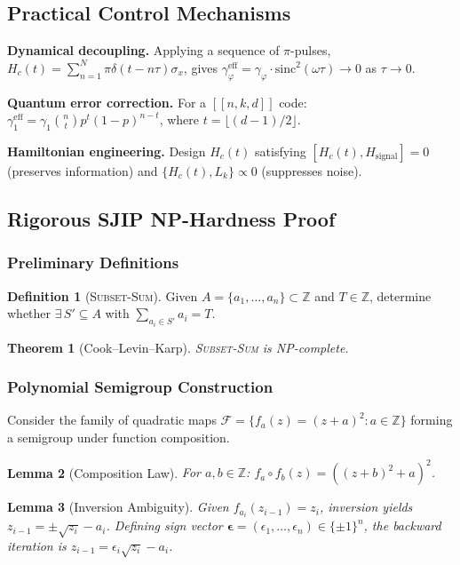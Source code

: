 \documentclass[12pt,a4paper]{article}
\theoremstyle{definition}
\newtheorem{definition}{Definition}[section]
\theoremstyle{plain}
\newtheorem{theorem}{Theorem}[section]
\newtheorem{lemma}[theorem]{Lemma}
\newcommand{\Z}{\mathbb{Z}}
\begin{document}
\subsection{Practical Control Mechanisms}

\textbf{Dynamical decoupling.} Applying a sequence of $\pi$-pulses,
$H_c(t)=\sum_{n=1}^N\pi\delta(t-n\tau)\sigma_x$, gives
$\gamma_\varphi^{\mathrm{eff}}=\gamma_\varphi\cdot\mathrm{sinc}^2(\omega\tau)\to0$ as $\tau\to0$.

\textbf{Quantum error correction.} For a $[[n,k,d]]$ code:
$\gamma_1^{\mathrm{eff}}=\gamma_1\binom{n}{t}p^t(1-p)^{n-t}$, where $t=\lfloor(d-1)/2\rfloor$.

\textbf{Hamiltonian engineering.} Design $H_c(t)$ satisfying
$[H_c(t),H_{\mathrm{signal}}]=0$ (preserves information) and $\{H_c(t),L_k\}\propto0$
(suppresses noise).

\subsection{Rigorous SJIP NP-Hardness Proof}
\label{sec:sjip_proof}

\subsubsection{Preliminary Definitions}

\begin{definition}[\textsc{Subset-Sum}]
Given $A=\{a_1,\dots,a_n\}\subset\Z$ and $T\in\Z$, determine whether $\exists\,S'\subseteq A$
with $\sum_{a_i\in S'}a_i=T$.
\end{definition}

\begin{theorem}[Cook--Levin--Karp]
\textsc{Subset-Sum} is NP-complete.
\end{theorem}

\subsubsection{Polynomial Semigroup Construction}

Consider the family of quadratic maps $\mathcal{F}=\{f_a(z)=(z+a)^2:a\in\Z\}$ forming
a semigroup under function composition.

\begin{lemma}[Composition Law]
For $a,b\in\Z$: $f_a\circ f_b(z)=((z+b)^2+a)^2$.
\end{lemma}

\begin{lemma}[Inversion Ambiguity]
Given $f_{a_i}(z_{i-1})=z_i$, inversion yields $z_{i-1}=\pm\sqrt{z_i}-a_i$.
Defining sign vector $\boldsymbol\epsilon=(\epsilon_1,\dots,\epsilon_n)\in\{{\pm1}\}^n$,
the backward iteration is $z_{i-1}=\epsilon_i\sqrt{z_i}-a_i$.
\end{lemma}
\end{document}
